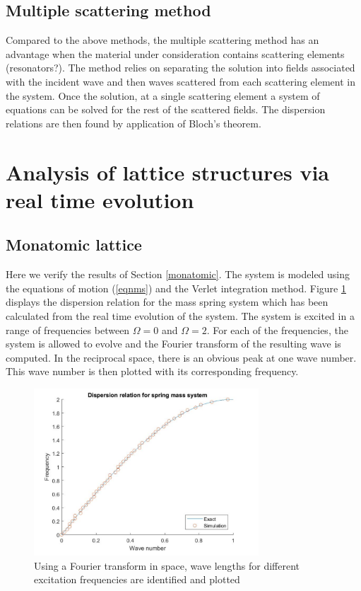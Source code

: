 \documentclass{article}
\begin{document}
\subsection{Multiple scattering method}
Compared to the above methods, the multiple scattering method has an advantage 
when the material under consideration contains scattering elements 
(resonators?). The method relies on separating the solution into fields 
associated with the incident wave and then waves scattered from each scattering 
element in the system. Once the solution, at a single scattering element a 
system of equations can be solved for the rest of the scattered fields. The 
dispersion relations are then found by application of Bloch's theorem. 

\section{Analysis of lattice structures via real time evolution}

\subsection{Monatomic lattice}
Here we verify the results of Section \ref{monatomic}. The system is modeled 
using the equations of motion (\ref{eqnms}) and the Verlet integration method. 
Figure \ref{fig:matlab-dr} displays the dispersion relation for the mass spring 
system which has been calculated from the real time evolution of the system. 
The system is excited in a range of frequencies between $\Omega=0$ and 
$\Omega=2$. For each of the frequencies, the system is allowed to evolve and 
the Fourier transform of the resulting wave is computed. In the reciprocal 
space, there is an obvious peak at one wave number. This wave number is then 
plotted with its corresponding frequency.
\begin{figure}[!htbp]
	\centering
	\includegraphics[width=0.75\textwidth]{matlab-dr.pdf}
	\caption{Using a Fourier transform in space, wave lengths for different 
	excitation frequencies are identified and plotted}
	\label{fig:matlab-dr}
\end{figure}
\end{document}
